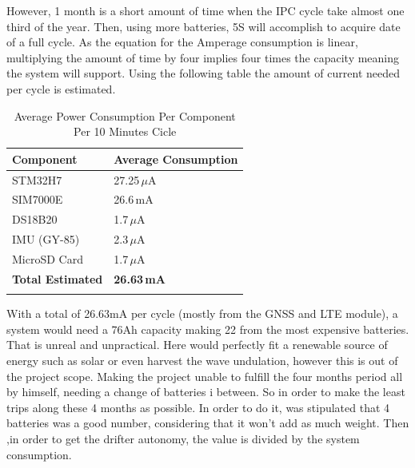 However, 1 month is a short amount of time when the IPC cycle take almost one third of 
the year. Then, using more batteries, 5S will accomplish to acquire date of a full cycle.
As the equation for the Amperage consumption is linear, multiplying the amount of time by 
four implies four times the capacity meaning the system will support. Using the following table
the amount of current needed per cycle is estimated. 
\begin{table}[h!]
    \centering
    \begin{tabular}{l|l}
        \textbf{Component} & \textbf{Average Consumption} \\
        \hline
        \arrayrulecolor[gray]{0.85}
        STM32H7      & 27.25\,$\mu$A \\
        \hline
        SIM7000E     & 26.6\,mA \\
        \hline
        DS18B20      & 1.7\,$\mu$A \\
        \hline
        IMU (GY-85)  & 2.3\,$\mu$A \\
        \hline
        MicroSD Card & 1.7\,$\mu$A \\
        \hline
        \textbf{Total Estimated} & \textbf{26.63\,mA} \\
        \arrayrulecolor{black}
    \end{tabular}
    \caption{Average Power Consumption Per Component Per 10 Minutes Cicle}
    \label{table:average_consumption}
\end{table}

With a total of 26.63mA per cycle (mostly from the GNSS and LTE module), a system would need a 76Ah
capacity making 22 from the most expensive batteries. That is unreal and unpractical. Here would perfectly
fit a renewable source of energy such as solar or even harvest the wave undulation, however this is out of the
project scope. Making the project unable to fulfill the four months period all by himself, needing a change of 
batteries i between. So in order to make the least trips along these 4 months as possible. In order to do it,
was stipulated that 4 batteries was a good number, considering that it won't add as much weight. Then 
,in order to get the drifter autonomy, the value is divided by the system consumption. 

